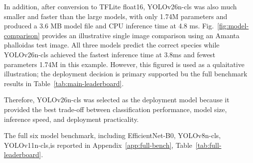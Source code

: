 \documentclass[journal,transmag]{IEEEtran}
\begin{document}
In addition, after conversion to TFLite float16, YOLOv26n-cls was also much smaller and faster than the large models, with only 1.74M parameters and produced a 3.6 MB model file and CPU inference time at 4.8 ms. Fig.~\ref{fig:model-comparison} provides an illustrative single image comparison using an Amanta phalloidas test image. All three models predict the correct 
species while YOLOv26n-cls achieved the fastest 
inference time at 3.8ms and fewest parameters 1.74M in this example. However, this figured is used as a qulaitative illustration; the deployment decision is primary supported bu the full benchmark results in Table~\ref{tab:main-leaderboard}.

Therefore, YOLOv26n-cls was selected as the deployment model because it provided the best trade-off between classification performance, model size, inference speed, and deployment practicality. 

The full six model benchmark, including
EfficientNet-B0, YOLOv8n-cls, YOLOv11n-cls,is reported in Appendix~\ref{app:full-bench}, Table~\ref{tab:full-leaderboard}.
\end{document}
